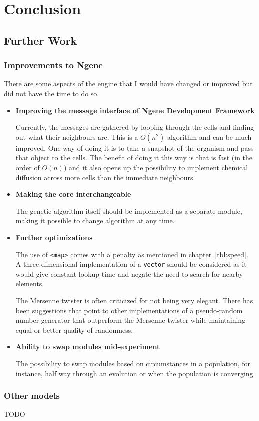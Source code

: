 \section{Conclusion}

\subsection{Further Work}

\subsubsection{Improvements to Ngene}
There are some aspects of the engine that I would have changed or improved but did not have the time to do so.

\begin{itemize}
	\itemsep=0pt
	\item\textbf{Improving the message interface of Ngene Development Framework}

	Currently, the messages are gathered by looping through the cells and finding out what their neighbours are. This is a $O(n^{2})$ algorithm and can be much improved. One way of doing it is to take a snapshot of the organism and pass that object to the cells. The benefit of doing it this way is that is fast (in the order of $O(n)$) and it also opens up the possibility to implement chemical diffusion across more cells than the immediate neighbours.

	\item\textbf{Making the core interchangeable}

	The genetic algorithm itself should be implemented as a separate module, making it possible to change algorithm at any time.

	\item\textbf{Further optimizations}

	The use of \texttt{<map>} comes with a penalty as mentioned in chapter~\ref{tbl:speed}. A three-dimensional implementation of a \texttt{vector} should be considered as it would give constant lookup time and negate the need to search for nearby elements.

	The Mersenne twister is often criticized for not being very elegant. There has been suggestions that point to other implementations of a pseudo-random number generator that outperform the Mersenne twister while maintaining equal or better quality of randomness.

	\item\textbf{Ability to swap modules mid-experiment}

	The possibility to swap modules based on circumstances in a population, for instance, half way through an evolution or when the population is converging.
\end{itemize}

\subsubsection{Other models}

TODO

